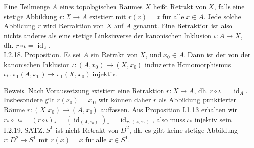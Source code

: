 \documentclass[10pt, letterpaper]{article}
\begin{document}
Eine Teilmenge $A$ eines topologischen Raumes $X$ heißt Retrakt von $X$, falls eine stetige Abbildung $r: X \rightarrow A$ existiert mit $r(x)=x$ für alle $x \in A$. Jede solche Abbildung $r$ wird Retraktion von $X$ auf $A$ genannt. Eine Retraktion ist also nichts anderes als eine stetige Linksinverse der kanonischen Inklusion $\iota: A \rightarrow X$, dh. $r \circ \iota=\operatorname{id}_{A}$.\\
I.2.18. Proposition. Es sei $A$ ein Retrakt von $X$, und $x_{0} \in A$. Dann ist der von der kanonischen Inklusion $\iota:\left(A, x_{0}\right) \rightarrow\left(X, x_{0}\right)$ induzierte Homomorphismus $\iota_{*}: \pi_{1}\left(A, x_{0}\right) \rightarrow \pi_{1}\left(X, x_{0}\right)$ injektiv.

Beweis. Nach Voraussetzung existiert eine Retraktion $r: X \rightarrow A$, dh. $r \circ \iota=$ $\operatorname{id}_{A}$. Insbesondere gilt $r\left(x_{0}\right)=x_{0}$, wir können daher $r$ als Abbildung punktierter Räume $r:\left(X, x_{0}\right) \rightarrow\left(A, x_{0}\right)$ auffassen. Aus Proposition I.1.13 erhalten wir $r_{*} \circ$ $\iota_{*}=(r \circ \iota)_{*}=\left(\operatorname{id}_{\left(A, x_{0}\right)}\right)_{*}=\operatorname{id}_{\pi_{1}\left(A, x_{0}\right)}$, also muss $\iota_{*}$ injektiv sein.\\
I.2.19. SATZ. $S^{1}$ ist nicht Retrakt von $D^{2}$, dh. es gibt keine stetige Abbildung $r: D^{2} \rightarrow S^{1}$ mit $r(x)=x$ für alle $x \in S^{1}$.
\end{document}
